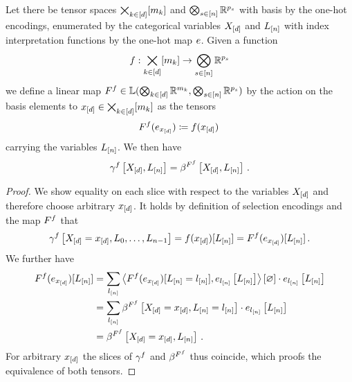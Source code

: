 \begin{theorem}
    \label{the:selectionToBasisEncoding}
    Let there be tensor spaces $\bigtimes_{k\in[d]}[m_{k}]$ and $\bigotimes_{s\in[n]}\mathbb{R}^{p_{s}}$ with basis by the one-hot encodings, enumerated by the categorical variables $X_{[d]}$ and $L_{[n]}$ with index interpretation functions by the one-hot map $e$.
    Given a function
    \begin{align*}
        f : \bigtimes_{k\in[d]}[m_{k}] \rightarrow \bigotimes_{s\in[n]}\mathbb{R}^{p_{s}}
    \end{align*}
    we define a linear map $F^{f}\in\mathbb{L}(\bigotimes_{k\in[d]} \mathbb{R}^{m_{k}},\bigotimes_{s\in[n]}\mathbb{R}^{p_{s}})$ by the action on the basis elements to $x_{[d]}\in\bigtimes_{k\in[d]}[m_{k}]$ as the tensors %
    \begin{align*}
        F^{f}(e_{x_{[d]}}) \coloneqq f(x_{[d]}) \,
    \end{align*}
    carrying the variables $L_{[n]}$.
    We then have
    \begin{align*}
        \gamma^{f}\left[X_{[d]},L_{[n]}\right]
        = \beta^{F^{f}}\left[X_{[d]},L_{[n]}\right] \, .
    \end{align*}
\end{theorem}
\begin{proof}
    We show equality on each slice with respect to the variables $X_{[d]}$ and therefore choose arbitrary $x_{[d]}$. %
    It holds by definition of selection encodings and the map $F^{f}$ that
    \begin{align*}
        \gamma^{f}\left[X_{[d]}=x_{[d]},L_{0},\ldots,L_{n-1}\right]
        = f(x_{[d]})[L_{[n]}]
        = F^{f}(e_{x_{[d]}})[L_{[n]}] \, .
    \end{align*}
    We further have
    \begin{align*}
        F^{f}(e_{x_{[d]}})[L_{[n]}]
        &= \sum_{l_{[n]}} \left\langle F^{f}(e_{x_{[d]}})[L_{[n]}=l_{[n]}],e_{l_{[n]}}\left[L_{[n]}\right]\right\rangle \left[ \varnothing \right] \cdot e_{l_{[n]}}\left[L_{[n]}\right] \\
        &= \sum_{l_{[n]}} \beta^{F^{f}}\left[X_{[d]}=x_{[d]},L_{[n]}=l_{[n]}\right] \cdot e_{l_{[n]}}\left[L_{[n]}\right] \\
        &= \beta^{F^{f}}\left[X_{[d]}=x_{[d]},L_{[n]}\right] \, .
    \end{align*}
    For arbitrary $x_{[d]}$ the slices of $\gamma^{f}$ and $\beta^{F^{f}}$ thus coincide, which proofs the equivalence of both tensors.
\end{proof}

